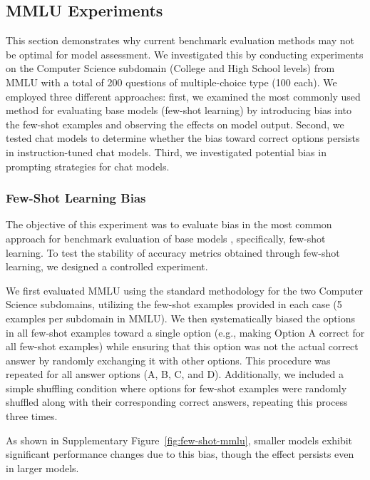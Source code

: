 \documentclass[10pt]{article}
\begin{document}

\subsection{MMLU Experiments}
\label{subsec:mmlu-exp}

This section demonstrates why current benchmark evaluation methods may not be optimal for model assessment. We investigated this by conducting experiments on the Computer Science subdomain (College and High School levels) from MMLU with a total of 200 questions of multiple-choice type (100 each). We employed three different approaches: first, we examined the most commonly used method for evaluating base models (few-shot learning) by introducing bias into the few-shot examples and observing the effects on model output. Second, we tested chat models to determine whether the bias toward correct options persists in instruction-tuned chat models. Third, we investigated potential bias in prompting strategies for chat models.

\subsubsection{Few-Shot Learning Bias}
\label{subsubsec:few-shot-mmlu}

The objective of this experiment was to evaluate bias in the most common approach for benchmark evaluation of base models \citep{brown2020language, hendrycks2020measuring}, specifically, few-shot learning. To test the stability of accuracy metrics obtained through few-shot learning, we designed a controlled experiment.

We first evaluated MMLU using the standard methodology for the two Computer Science subdomains, utilizing the few-shot examples provided in each case (5 examples per subdomain in MMLU). We then systematically biased the options in all few-shot examples toward a single option (e.g., making Option A correct for all few-shot examples) while ensuring that this option was not the actual correct answer by randomly exchanging it with other options. This procedure was repeated for all answer options (A, B, C, and D). Additionally, we included a simple shuffling condition where options for few-shot examples were randomly shuffled along with their corresponding correct answers, repeating this process three times.

As shown in Supplementary Figure~\ref{fig:few-shot-mmlu}, smaller models exhibit significant performance changes due to this bias, though the effect persists even in larger models.
\end{document}
